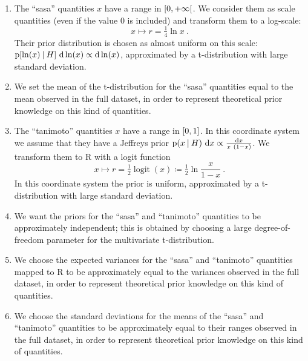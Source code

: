 \documentclass[\ifafour a4paper,12pt,\else a5paper,10pt,\fi%
onecolumn,oneside,article,%
british%
]{memoir}
\theoremstyle{remark}
\theoremstyle{innote}
\newcommand*{\di}{\mathrm{d}}%
\newcommand*{\RR}{\bm{\mathrm{R}}}
\newcommand*{\defd}{\coloneqq}
\DeclarePairedDelimiter\clcl{[}{]}
\DeclarePairedDelimiter\clop{[}{[}
\newcommand*{\p}{\mathrm{p}}%
\renewcommand*{\|}[1][]{\nonscript\:#1\vert\nonscript\:\mathopen{}}
\renewcommand*{\=}{\TextOrMath\texteq\eq}
\DeclareMathOperator*{\logit}{logit}
\begin{document}
\begin{enumerate}[label=(\alph*)]
\item The \enquote{sasa} quantities $x$ have a range in $\clop{0,+\infty}$.
  We consider them as scale quantities (even if the value $0$ is included)
  and transform them to a log-scale:
    \begin{equation}
    \label{eq:log_sasa}
    x \mapsto r = \tfrac{1}{4}\ln x \ .
  \end{equation}
  Their prior distribution is chosen as almost uniform on this scale:
  $\p[\ln(x) \| H]\ \di\ln(x) \propto \di\ln(x)$, approximated by a
  t-distribution with large standard deviation.

\item We set the mean of the t-distribution for the \enquote{sasa}
  quantities equal to the mean observed in the full dataset, in order to represent
  theoretical prior knowledge on this kind of quantities.

\item The \enquote{tanimoto} quantities $x$ have a range in $\clcl{0,1}$.
  In this coordinate system we assume that they have a Jeffreys prior $\p(x
  \| H)\ \di x \propto \frac{\di x}{x\ (1-x)}$.
  We transform them to $\RR$ with a logit function
  \begin{equation}
    \label{eq:logit_tanimoto}
    x \mapsto r = \tfrac{1}{2}\logit(x) \defd \tfrac{1}{2}\ln\frac{x}{1-x} \ .
  \end{equation}
In this coordinate system the prior is uniform, approximated by a
t-distribution with large standard deviation.

\item We want the priors for the \enquote{sasa} and \enquote{tanimoto}
  quantities to be approximately independent; this is obtained by choosing
  a large degree-of-freedom parameter for the multivariate t-distribution.
\item We choose the expected variances for the \enquote{sasa} and
  \enquote{tanimoto} quantities mapped to $\RR$ to be approximately equal
  to the variances observed in the full dataset, in order to represent
  theoretical prior knowledge on this kind of quantities.
\item We choose the standard deviations for the means of the \enquote{sasa}
  and \enquote{tanimoto} quantities to be approximately equal to their
  ranges observed in the full dataset, in order to represent theoretical
  prior knowledge on this kind of quantities.
\end{enumerate}
\end{document}
